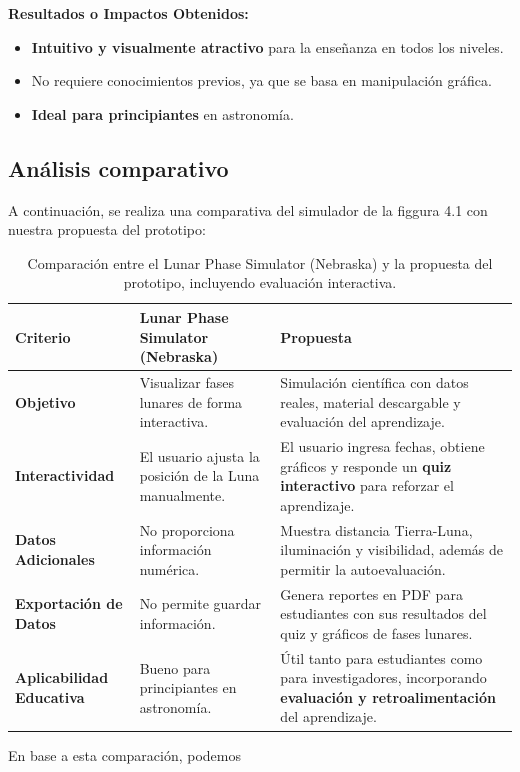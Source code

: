 \textbf{ Resultados o Impactos Obtenidos:}
\begin{itemize}
    \item \textbf{Intuitivo y visualmente atractivo} para la enseñanza en todos los niveles.
    \item No requiere conocimientos previos, ya que se basa en manipulación gráfica.
    \item \textbf{Ideal para principiantes} en astronomía.
\end{itemize}

\subsection{Análisis comparativo}

A continuación, se realiza una comparativa del simulador de la figgura 4.1 con nuestra propuesta del prototipo:

\begin{table}[H]
    \centering
    \begin{tabular}{|p{4.5cm}|p{5.5cm}|p{5.5cm}|}
        \hline
        \textbf{Criterio} & \textbf{Lunar Phase Simulator (Nebraska)} & \textbf{Propuesta} \\
        \hline
        \textbf{Objetivo} & Visualizar fases lunares de forma interactiva. & Simulación científica con datos reales, material descargable y evaluación del aprendizaje. \\
        \hline
        \textbf{Interactividad} & El usuario ajusta la posición de la Luna manualmente. & El usuario ingresa fechas, obtiene gráficos y responde un \textbf{quiz interactivo} para reforzar el aprendizaje. \\
        \hline
        \textbf{Datos Adicionales} & No proporciona información numérica. & Muestra distancia Tierra-Luna, iluminación y visibilidad, además de permitir la autoevaluación. \\
        \hline
        \textbf{Exportación de Datos} & No permite guardar información. & Genera reportes en PDF para estudiantes con sus resultados del quiz y gráficos de fases lunares. \\
        \hline
        \textbf{Aplicabilidad Educativa} & Bueno para principiantes en astronomía. & Útil tanto para estudiantes como para investigadores, incorporando \textbf{evaluación y retroalimentación} del aprendizaje. \\
        \hline
    \end{tabular}
    \label{tab:comparacion}
    \caption{Comparación entre el Lunar Phase Simulator (Nebraska) y la propuesta del prototipo, incluyendo evaluación interactiva.}
\end{table}


En base a esta comparación, podemos

